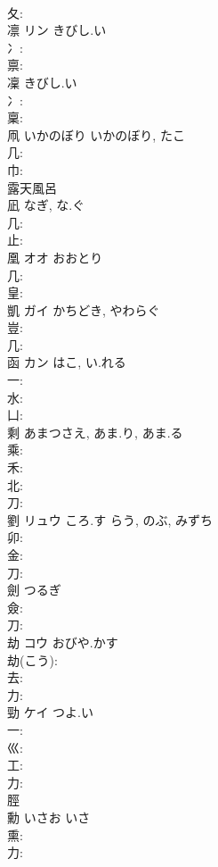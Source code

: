 \documentclass[8pt]{extreport}
\begin{document}
\begin{CJK}{UTF8}{min}
\\	夂: 
\\	凛	リン	きびし.い		
\\	冫: 
\\	禀: 
\\	凜		きびし.い				
\\	冫: 
\\	稟: 
\\	凧	いかのぼり	いかのぼり, たこ		
\\	几: 
\\	巾: 
\\	露天風呂 
\\	凪		なぎ, な.ぐ				
\\	几: 
\\	止: 
\\	凰	オオ	おおとり		
\\	几: 
\\	皇: 
\\	凱	ガイ	かちどき, やわらぐ		
\\	豈: 
\\	几: 
\\	函	カン	はこ, い.れる		
\\	一: 
\\	水: 
\\	凵: 
\\	剩		あまつさえ, あま.り, あま.る				
\\	乘: 
\\	禾: 
\\	北: 
\\	刀: 
\\	劉	リュウ	ころ.す	らう, のぶ, みずち	
\\	卯: 
\\	金: 
\\	刀: 
\\	劍		つるぎ				
\\	僉: 
\\	刀: 
\\	劫	コウ	おびや.かす		
\\	劫(こう): 
\\	去: 
\\	力: 
\\	勁	ケイ	つよ.い		
\\	一: 
\\	巛: 
\\	工: 
\\	力: 
\\	脛 
\\	勳		いさお	いさ			
\\	熏: 
\\	力: 

\end{CJK}
\end{document}
